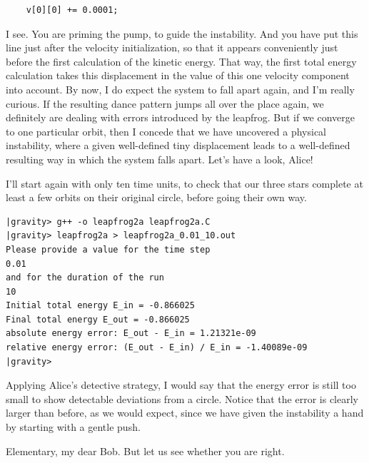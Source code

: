 \cba

\begin{small}
\begin{verbatim}
    v[0][0] += 0.0001;
\end{verbatim}
\end{small}

\abc

\bob
I see.  You are priming the pump, to guide the instability.  And
you have put this line just after the velocity initialization,
so that it appears conveniently just before the first calculation of
the kinetic energy.  That way, the first total energy calculation
takes this displacement in the value of this one velocity component
into account.  By now, I do expect the system to fall apart again, and
I'm really curious.  If the resulting dance pattern jumps all over the
place again, we definitely are dealing with errors introduced by the
leapfrog.  But if we converge to one particular orbit, then I concede
that we have uncovered a physical instability, where a given
well-defined tiny displacement leads to a well-defined resulting way
in which the system falls apart.  Let's have a look, Alice!

\alice
I'll start again with only ten time units, to check that our
three stars complete at least a few orbits on their original circle,
before going their own way.

\cba

\begin{small}
\begin{verbatim}
|gravity> g++ -o leapfrog2a leapfrog2a.C
|gravity> leapfrog2a > leapfrog2a_0.01_10.out
Please provide a value for the time step
0.01
and for the duration of the run
10
Initial total energy E_in = -0.866025
Final total energy E_out = -0.866025
absolute energy error: E_out - E_in = 1.21321e-09
relative energy error: (E_out - E_in) / E_in = -1.40089e-09
|gravity>
\end{verbatim}
\end{small}

\abc

\bob
Applying Alice's detective strategy, I would say that the energy error
is still too small to show detectable deviations from a circle.
Notice that the error is clearly larger than before, as we would
expect, since we have given the instability a hand by starting
with a gentle push.

\alice
Elementary, my dear Bob.  But let us see whether you are right.

\cba

